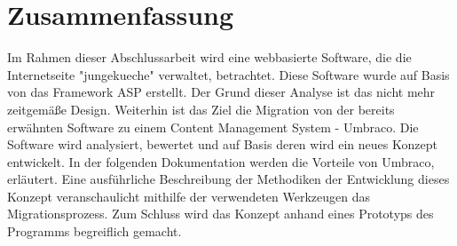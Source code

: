 \chapter*{Zusammenfassung}
Im Rahmen dieser Abschlussarbeit wird eine webbasierte Software, die die Internetseite "jungekueche" verwaltet, betrachtet. Diese Software wurde auf Basis von das Framework ASP erstellt. Der Grund dieser Analyse ist das nicht mehr zeitgemäße Design. Weiterhin ist das Ziel die Migration von der bereits erwähnten Software zu einem Content Management System - Umbraco. Die Software wird analysiert, bewertet und auf Basis deren wird ein neues Konzept entwickelt. In der folgenden Dokumentation werden die Vorteile von Umbraco, erläutert. Eine ausführliche Beschreibung der Methodiken der Entwicklung dieses Konzept veranschaulicht mithilfe der verwendeten Werkzeugen das Migrationsprozess. Zum Schluss wird das Konzept anhand eines Prototyps des Programms begreiflich gemacht.